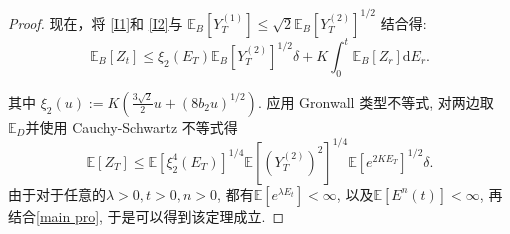 \begin{proof}
	现在，将 \cref{I1}和 \cref{I2}与  $\mathbb{E}_B[Y_T^{(1)}]\leq\sqrt{2}\mathbb{E}_B[Y_T^{(2)}]^{1/2}$ 结合得:
	\begin{equation*}
		\mathbb{E}_B[Z_t] 
		\leq \xi_2(E_T)\mathbb{E}_B[Y_T^{(2)}]^{1/2}\delta + K\int_0^t\mathbb{E}_B[Z_r] \mathrm{d}E_r.
	\end{equation*}
	
	其中 $\xi_2(u) := K(\frac{3\sqrt{2}}{2}u + (8b_2u)^{1/2}).$
	应用 Gronwall 类型不等式, 对两边取 $ \mathbb{E}_D $并使用 Cauchy-Schwartz 不等式得 
	\begin{equation*}
		\mathbb{E}[Z_T] \leq \mathbb{E}[\xi_2^4(E_T)]^{1/4}\mathbb{E}[(Y_T^{(2)})^2]^{1/4}\mathbb{E}[e^{2KE_T}]^{1/2}\delta.
	\end{equation*}
	由于对于任意的$\lambda>0, t>0,n>0$, 都有$\mathbb{E}[e^{\lambda E_t}] < \infty$, 以及$\mathbb{E}[E^n(t)] < \infty$, 再结合\cref{main pro}, 于是可以得到该定理成立.
	
	
	
	
	
\end{proof}
